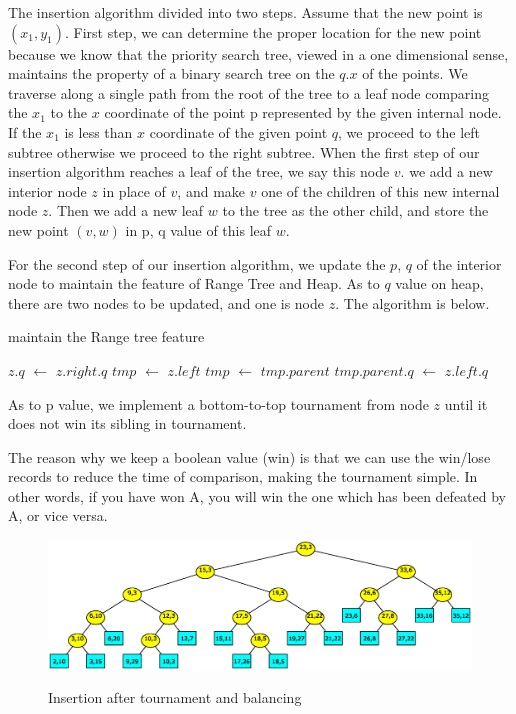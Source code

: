 \documentclass{acm_proc_article-sp}
\begin{document}
The insertion algorithm divided into two steps. Assume that the new
point is $(x_1,y_1)$. First step, we can determine the proper location
for the new point because we know that the priority search tree,
viewed in a one dimensional sense, maintains the property of a
binary search tree on the $q.x$ of the points. We traverse along a
single path from the root of the tree to a leaf node comparing the
$x_1$ to the $x$ coordinate of the point p represented by the given
internal node. If the $x_1$ is less than $x$ coordinate of the given
point $q$, we proceed to the left subtree otherwise we proceed to
the right subtree. When the first step of our insertion algorithm
reaches a leaf of the tree, we say this node $v$. we add a new
interior node $z$ in place of $v$, and make $v$ one of the children of
this new internal node $z$. Then we add a new leaf $w$ to the tree as
the other child, and store the new point $(v,w)$ in p, q value of
this leaf $w$.

For the second step of our insertion algorithm, we update the $p$, $q$
of the interior node to maintain the feature of Range Tree and Heap.
As to $q$ value on heap, there are two nodes to be updated, and one
is node $z$. The algorithm is below.
\begin{algorithm}[!h]
\caption{maintain the Range tree feature} \label{alg:rangetreefeature}
	\begin{algorithmic}[1]
	\STATE $z.q$ $\leftarrow$ $z.right.q$
	\STATE $tmp$ $\leftarrow$ $z.left$
	\STATE $tmp$ $\leftarrow$ $tmp.parent$
	\STATE $tmp.parent.q$ $\leftarrow$ $z.left.q$
	\ENDIF
	\ENDWHILE
	\end{algorithmic}
\end{algorithm}

As to p value, we implement a bottom-to-top tournament from node
$z$ until it does not win its sibling in tournament.

The reason why we keep a boolean value (win) is that we can use the
win/lose records to reduce the time of comparison, making the
tournament simple. In other words, if you have won A, you will win the
one which has been defeated by A, or vice versa.
\begin{figure}[!h]
  \centering
  \includegraphics[scale=0.5]{pst_insert}\\
  \caption{Insertion after tournament and balancing}\label{fig:pst_insert}
\end{figure}
\end{document}
